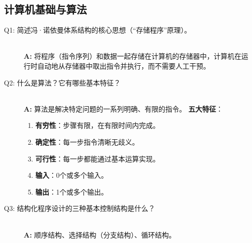 \documentclass[a4paper,12pt]{article}
\begin{document}
\subsection{计算机基础与算法}
\begin{description}
    \item[Q1: 简述冯·诺依曼体系结构的核心思想（“存储程序”原理）。] \hfill \\
    \textbf{A:} 将程序（指令序列）和数据一起存储在计算机的存储器中，计算机在运行时自动地从存储器中取出指令并执行，而不需要人工干预。
    
    \item[Q2: 什么是算法？它有哪些基本特征？] \hfill \\
    \textbf{A:} 算法是解决特定问题的一系列明确、有限的指令。
    \textbf{五大特征}：
    \begin{enumerate}
        \item \textbf{有穷性}：步骤有限，在有限时间内完成。
        \item \textbf{确定性}：每一步指令清晰无歧义。
        \item \textbf{可行性}：每一步都能通过基本运算实现。
        \item \textbf{输入}：0个或多个输入。
        \item \textbf{输出}：1个或多个输出。
    \end{enumerate}

    \item[Q3: 结构化程序设计的三种基本控制结构是什么？] \hfill \\
    \textbf{A:} 顺序结构、选择结构（分支结构）、循环结构。
\end{description}
\end{document}
